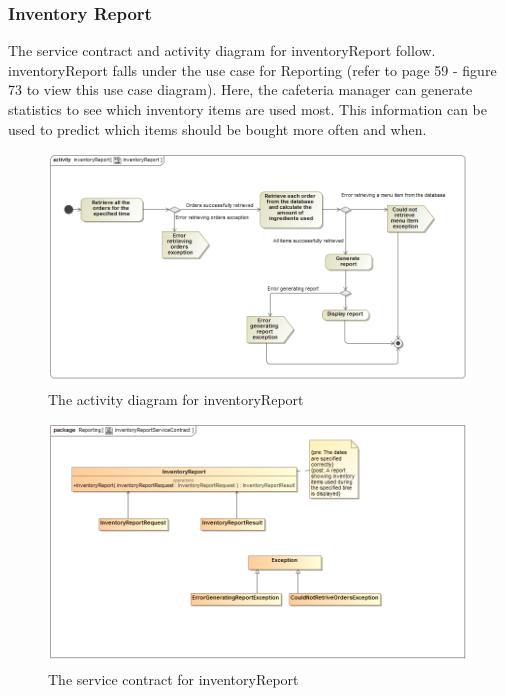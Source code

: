 \documentclass[a4paper,12pt]{report}
\begin{document}
\subsubsection{Inventory Report }
The service contract and activity diagram for inventoryReport follow. inventoryReport falls under the use case for Reporting (refer to page 59 - figure 73 to view this use case diagram). Here, the cafeteria manager can generate statistics to see which inventory items are used most. This information can be used to predict which items should be bought more often and when. 
\begin{figure}[H]
  \centering
    \includegraphics[width=1.0\textwidth]{../images/inventoryReportActivityDiagram.png}
    \caption{The activity diagram for inventoryReport} 
\end{figure}
\begin{figure}[H]
  \centering
    \includegraphics[width=1.0\textwidth]{../images/inventoryReportServiceContract.png}
    \caption{The service contract for inventoryReport} 
\end{figure}
\end{document}
